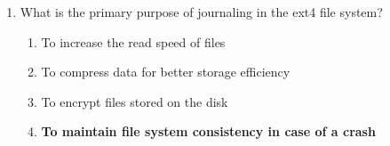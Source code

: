 \begin{enumerate}
    \item What is the primary purpose of journaling in the ext4 file system?
    \begin{enumerate}
        \item To increase the read speed of files
        \item To compress data for better storage efficiency
        \item To encrypt files stored on the disk
        \item \textbf{To maintain file system consistency in case of a crash}
    \end{enumerate}
\end{enumerate}

